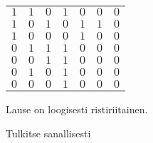 \begin{tehtava}
\begin{vastaus}
\begin{alakohdat}
{\begin{center}
\begin{tabular}{|c|c|c|c|c|c|c|}
		    $1$ & $1$ & $0$ & $1$ & $0$ & $0$ & $0$ \\
		    $1$ & $0$ & $1$ & $0$ & $1$ & $1$ & $0$ \\
		    $1$ & $0$ & $0$ & $0$ & $1$ & $0$ & $0$ \\
		    $0$ & $1$ & $1$ & $1$ & $0$ & $0$ & $0$ \\
		    $0$ & $0$ & $1$ & $1$ & $0$ & $0$ & $0$ \\
		    $0$ & $1$ & $0$ & $1$ & $0$ & $0$ & $0$ \\
		    $0$ & $0$ & $0$ & $1$ & $0$ & $0$ & $0$ \\ \hline
\end{tabular}
\end{center}
Lause on loogisesti ristiriitainen.}
        \end{alakohdat}
    \end{vastaus}
    
\end{tehtava}

\begin{tehtava}
     Tulkitse sanallisesti
    \begin{alakohdat}
    \end{alakohdat}

    \begin{vastaus}
    
        \begin{alakohdat}
        \end{alakohdat}
    \end{vastaus}
    
\end{tehtava}

